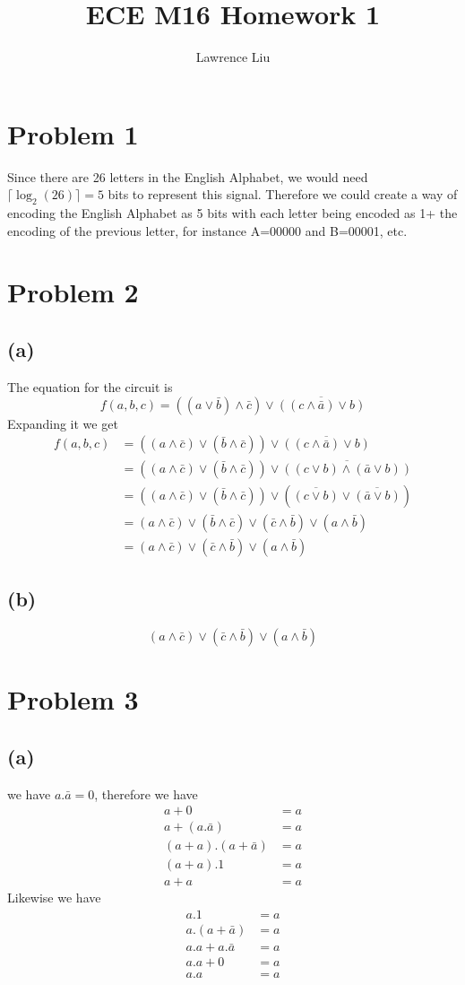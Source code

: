 \documentclass[12pt]{article}
\title{ECE M16 Homework 1}
\author{Lawrence Liu}
\begin{document}
\maketitle
\section*{Problem 1}
Since there are 26 letters in the English Alphabet, we would need $\lceil \log_2 (26)\rceil=5$ bits to represent this signal.
Therefore we could create a way of encoding the English Alphabet as 5 bits with each letter being encoded as 1+ the encoding of the previous letter, for instance 
A=00000 and B=00001, etc.
\section*{Problem 2}
\subsection*{(a)}
The equation for the circuit is 
$$f(a,b,c)=((a\vee \bar{b})\wedge\bar{c})\vee\overline{((c\wedge\bar{a})\vee b)}$$
Expanding it we get
\begin{align*}
    f(a,b,c)&=((a\wedge\bar{c})\vee (\bar{b}\wedge\bar{c}))
                \vee\overline{((c\wedge\bar{a})\vee b)}\\
    &=((a\wedge\bar{c})\vee (\bar{b}\wedge\bar{c}))
    \vee\overline{((c\vee b)\wedge(\bar{a}\vee b))}\\
    &=((a\wedge\bar{c})\vee (\bar{b}\wedge\bar{c}))
    \vee(\overline{(c\vee b)}\vee\overline{(\bar{a}\vee b)})\\
    &=(a\wedge\bar{c})\vee (\bar{b}\wedge\bar{c})
    \vee(\bar{c}\wedge \bar{b})\vee(a\wedge\bar{b})\\
    &=\boxed{(a\wedge\bar{c})
    \vee(\bar{c}\wedge \bar{b})\vee(a\wedge\bar{b})}
\end{align*}
\subsection*{(b)}
$$\boxed{(a\wedge\bar{c})
\vee(\bar{c}\wedge \bar{b})\vee(a\wedge\bar{b})}$$
\section*{Problem 3}
\subsection*{(a)}
we have $a.\bar{a}=0$, therefore we have
\begin{align*}
    a+0&=a\\
    a+(a.\bar{a})&=a\\
    (a+a).(a+\bar{a})&=a\\
    (a+a).1&=a\\
    a+a&=a
\end{align*}
Likewise we have
\begin{align*}
    a.1&=a\\
    a.(a+\bar{a})&=a\\
    a.a+a.\bar{a}&=a\\
    a.a+0&=a\\
    a.a&=a
\end{align*}
\end{document}
